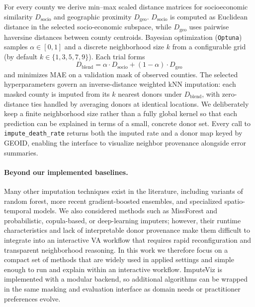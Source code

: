 \documentclass[review]{vgtc}
\begin{document}
For every county we derive min--max scaled distance matrices for socioeconomic similarity \(D_{\text{socio}}\) and geographic proximity \(D_{\text{geo}}\). \(D_{\text{socio}}\) is computed as Euclidean distance in the selected socio-economic subspace, while \(D_{\text{geo}}\) uses pairwise haversine distances between county centroids. Bayesian optimization (\texttt{Optuna}) samples \(\alpha \in [0,1]\) and a discrete neighborhood size \(k\) from a configurable grid (by default \(k \in \{1,3,5,7,9\}\)). Each trial forms
\begin{equation}
  D_{\text{blend}} = \alpha \cdot D_{\text{socio}} + (1-\alpha) \cdot D_{\text{geo}}
\end{equation}
and minimizes MAE on a validation mask of observed counties. The selected hyperparameters govern an inverse-distance weighted kNN imputation: each masked county is imputed from its \(k\) nearest donors under \(D_{\text{blend}}\), with zero-distance ties handled by averaging donors at identical locations. We deliberately keep a finite neighborhood size rather than a fully global kernel so that each prediction can be explained in terms of a small, concrete donor set. Every call to \texttt{impute\_death\_rate} returns both the imputed rate and a donor map keyed by GEOID, enabling the interface to visualize neighbor provenance alongside error summaries.

\paragraph*{Beyond our implemented baselines.}
Many other imputation techniques exist in the literature, including variants of random forest, more recent gradient-boosted ensembles, and specialized spatio-temporal models. We also considered methods such as MissForest \cite{stekhoven2012missforest} and probabilistic, copula-based, or deep-learning imputers; however, their runtime characteristics and lack of interpretable donor provenance make them difficult to integrate into an interactive VA workflow that requires rapid reconfiguration and transparent neighborhood reasoning. In this work we therefore focus on a compact set of methods that are widely used in applied settings and simple enough to run and explain within an interactive workflow. ImputeViz is implemented with a modular backend, so additional algorithms can be wrapped in the same masking and evaluation interface as domain needs or practitioner preferences evolve.

\vspace{-6pt}
\end{document}

